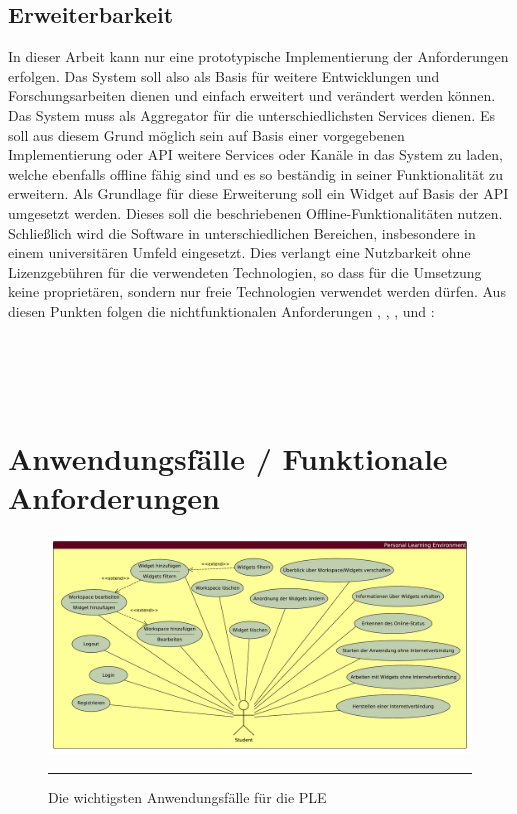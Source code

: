 \subsection{Erweiterbarkeit}
In dieser Arbeit kann nur eine prototypische Implementierung der Anforderungen erfolgen. Das System soll also als Basis für weitere Entwicklungen und Forschungsarbeiten dienen und einfach erweitert und verändert werden können. Das System muss als Aggregator für die unterschiedlichsten Services dienen. Es soll aus diesem Grund möglich sein auf Basis einer vorgegebenen Implementierung oder API weitere Services oder Kanäle in das System zu laden, welche ebenfalls offline fähig sind und es so beständig in seiner Funktionalität zu erweitern. Als Grundlage für diese Erweiterung soll ein Widget auf Basis der API umgesetzt werden. Dieses soll die beschriebenen Offline-Funktionalitäten nutzen. Schließlich wird die Software in unterschiedlichen Bereichen, insbesondere in einem universitären Umfeld eingesetzt. Dies verlangt eine Nutzbarkeit ohne Lizenzgebühren für die verwendeten Technologien, so dass für die Umsetzung keine proprietären, sondern nur freie Technologien verwendet werden dürfen. Aus diesen Punkten folgen die nichtfunktionalen Anforderungen , , , und :\\
\requirement{\requirementNewWidgetsWithApi}\label{requirementNewWidgetsWithApi}\\
\requirement{\requirementExampleWidget}\label{requirementExampleWidget}\\
\requirement{\requirementExtensibility}\label{requirementExtensibility}\\
\requirement{\requirementOpenSource}\label{requirementOpenSource}\\

\section{Anwendungsfälle / Funktionale Anforderungen}\label{section:anwendungsfaelle}
\begin{figure}[hb]
  \centering
  \includegraphics[width=\textwidth,height=\textheight,keepaspectratio]{./Figures/anwendungsfaelle_quer.pdf}
    \rule{35em}{0.5pt}
  \caption[Anwendungsfälle der PLE]{Die wichtigsten Anwendungsfälle für die PLE}
  \label{fig:anwendungsfaelle}
\end{figure}

